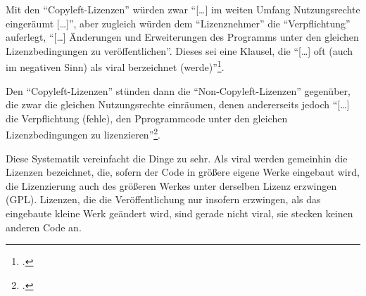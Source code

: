 \documentclass[DIV=calc,BCOR=5mm,11pt,headings=small,oneside,abstract=true, toc=bib]{scrartcl}
\begin{document}
Mit den \enquote{Copyleft-Lizenzen} würden zwar \enquote{[\ldots] im weiten
Umfang Nutzungsrechte eingeräumt [\ldots]}, aber zugleich würden dem
\enquote{Lizenznehmer} die \enquote{Verpflichtung} auferlegt,
\enquote{[\ldots] Änderungen und Erweiterungen des Programms unter den gleichen
Lizenzbedingungen zu veröffentlichen}. Dieses sei eine Klausel, die
\enquote{[\ldots] oft (auch im negativen Sinn) als viral berzeichnet
(werde)}\footcite[vgl.][19f]{DeNicolo2010a}.

Den \enquote{Copyleft-Lizenzen} stünden dann die
\enquote{Non-Copyleft-Lizenzen} gegenüber, die zwar die gleichen
Nutzungsrechte einräumen, denen andererseits jedoch \enquote{[\ldots] die
Verpflichtung (fehle), den Pprogrammcode unter den gleichen Lizenzbedingungen zu
lizenzieren}\footcite[vgl.][20]{DeNicolo2010a}.

Diese Systematik vereinfacht die Dinge zu sehr. Als viral werden gemeinhin
die Lizenzen bezeichnet, die, sofern der Code in größere eigene Werke eingebaut
wird, die Lizenzierung auch des größeren Werkes unter derselben Lizenz erzwingen
(GPL). Lizenzen, die die Veröffentlichung nur insofern erzwingen, als das
eingebaute kleine Werk geändert wird, sind gerade nicht viral, sie stecken
keinen anderen Code an.

\small

\end{document}
